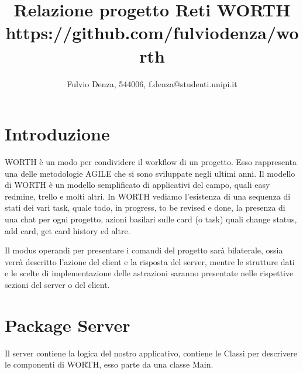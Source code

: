 \documentclass[]{article}
\title{Relazione progetto Reti WORTH
\large https://github.com/fulviodenza/worth}
\author{Fulvio Denza, 544006, f.denza@studenti.unipi.it}
\begin{document}
\maketitle

\section{Introduzione}
WORTH è un modo per condividere il workflow di un progetto. Esso rappresenta una delle metodologie AGILE che si sono sviluppate negli ultimi anni. Il modello di WORTH è un modello semplificato di applicativi del campo, quali easy redmine, trello e molti altri. In WORTH vediamo l'esistenza di una sequenza di stati dei vari task, quale todo, in progress, to be revised e done, la presenza di una chat per ogni progetto, azioni basilari sulle card (o task) quali change status, add card, get card history ed altre.

Il modus operandi per presentare i comandi del progetto sarà bilaterale, ossia verrà descritto l'azione del client e la risposta del server, mentre le strutture dati e le scelte di implementazione delle astrazioni saranno presentate nelle rispettive sezioni del server o del client.

\section{Package Server}
Il server contiene la logica del nostro applicativo, contiene le Classi per descrivere le componenti di WORTH, esso parte da una classe Main.
\end{document}
